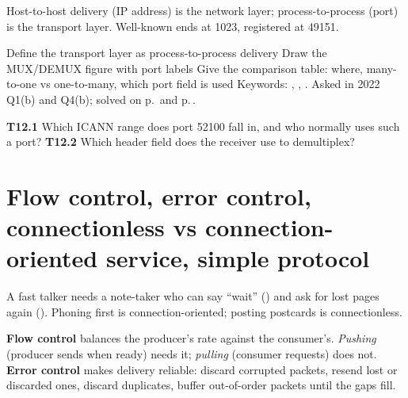 \begin{warningbox}
Host-to-host delivery (IP address) is the network layer; process-to-process (port) is the transport layer. Well-known ends at 1023, registered at 49151.
\end{warningbox}

\begin{answerplan}
 Define the transport layer as process-to-process delivery \quad {} Draw the MUX/DEMUX figure with port labels \quad
{} Give the comparison table: where, many-to-one vs one-to-many, which port field is used \quad {} Keywords: , , .
Asked in 2022 Q1(b) and Q4(b); solved on p.\,\pageref{q:MS2022-1b} and p.\,\pageref{q:MS2022-4b}.
\par{} \textbf{T12.1} Which ICANN range does port 52100 fall in, and who normally uses such a port?\quad
\textbf{T12.2} Which header field does the receiver use to demultiplex?
\end{answerplan}

\section{Flow control, error control, connectionless vs connection-oriented service, simple protocol}\label{sec:T13}
  

\begin{intuitionbox}
A fast talker needs a note-taker who can say ``wait'' () and ask for lost pages again (). Phoning first is connection-oriented; posting postcards is connectionless.
\end{intuitionbox}

\begin{definitionbox}
\textbf{Flow control} balances the producer's rate against the consumer's. \emph{Pushing} (producer sends when ready) needs it; \emph{pulling} (consumer requests) does not. \textbf{Error control} makes delivery reliable: discard corrupted packets, resend lost or discarded ones, discard duplicates, buffer out-of-order packets until the gaps fill. 
\end{definitionbox}

